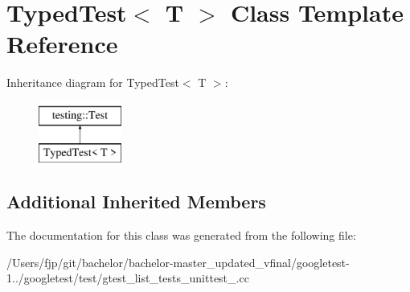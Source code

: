 \hypertarget{class_typed_test}{}\section{Typed\+Test$<$ T $>$ Class Template Reference}
\label{class_typed_test}
Inheritance diagram for Typed\+Test$<$ T $>$\+:\begin{figure}[H]
\begin{center}
\leavevmode
\includegraphics[height=2.000000cm]{class_typed_test}
\end{center}
\end{figure}
\subsection*{Additional Inherited Members}


The documentation for this class was generated from the following file\+:\begin{DoxyCompactItemize}
\item 
/\+Users/fjp/git/bachelor/bachelor-\/master\+\_\+updated\+\_\+vfinal/googletest-\/1../googletest/test/gtest\+\_\+list\+\_\+tests\+\_\+unittest\+\_\+.\+cc\end{DoxyCompactItemize}
